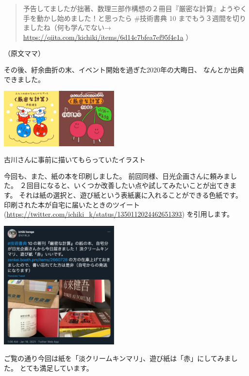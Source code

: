 \documentclass[dvipdfmx,autodetect-engine,10pt,b5paper,papersize,openany,dvipsnames]{jsbook}
\begin{document}
\begin{multicols}{2}
\begin{quotation}
  予告してましたが拙著、数理三部作構想の２冊目『厳密な計算』ようやく手を動かし始めました！と思ったら \#技術書典 10 までもう３週間を切りましたね（何も学んでない→ \url{https://qiita.com/kichiki/items/6d14c7bfea7ef95f4e1a} ）
\end{quotation}

（原文ママ）

その後、紆余曲折の末、イベント開始を過ぎた2020年の大晦日、
なんとか出典できました。

\vspace{1em}
\includegraphics[width=0.45\textwidth]{images/202101/exact-computation-furukawa.jpg}
\begin{center}
  {\small 古川さんに事前に描いてもらっていたイラスト}
\end{center}
\vspace{1em}

今回も、また、紙の本を印刷しました。
前回同様、日光企画さんに頼みました。
２回目になると、いくつか改善したい点や試してみたいことが出てきます。
それは紙の選択と、遊び紙という表紙裏に入れることができる色紙です。
印刷された本が自宅に届いたときのツイート
(\url{https://twitter.com/ichiki_k/status/1350112024462651393})
を引用します。

\includegraphics[width=0.45\textwidth]{images/202101/tweet-exact-computation-book.jpg}

ご覧の通り今回は紙を「淡クリームキンマリ」、遊び紙は「赤」にしてみました。
とても満足しています。


\end{multicols}
\end{document}
